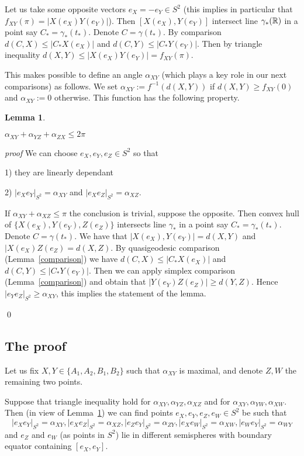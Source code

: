 \documentclass[a4paper,12pt]{article}
\newtheorem{lemma}[theorem]{Lemma}
\theoremstyle{definition}
\theoremstyle{definition}
\theoremstyle{definition}
\begin{document}
Let us take some opposite vectors $e_X=- e_Y\in S^2$ (this implies in particular
that $f_{XY}(\pi)=|X(e_X) Y(e_Y)|$).
Then $[X(e_X), Y(e_Y)]$ intersect line $\gamma_*({\mathbb R})$ in a point say
$C_*=\gamma_*(t_*)$.  Denote  $C=\gamma(t_*)$.
By comparison $d(C,X)\le |C_*X(e_X)|$ and $d(C,Y)\le |C_*Y(e_Y)|$.
Then by triangle inequality $d(X,Y)\le |X(e_X) Y(e_Y)|=f_{XY}(\pi)$.


This makes possible to define an angle $\alpha_{XY}$ (which plays a key role
in our next comparisons) as follows. We set
  $\alpha_{XY}:= f^{-1}(d(X,Y))$  if $d(X,Y)\ge f_{XY}(0)$
  and   $\alpha_{XY}:=0$
  otherwise. 
  This function has the following property.
  
  
  
   \begin{lemma}\label{<2pi}
  
 
   $\alpha_{XY}+\alpha_{YZ}+\alpha_{ZX}\le2\pi$
    
     \end{lemma}
     
     {\it proof}
     We can choose $e_X, e_Y, e_Z\in S^2$ so that
     
    1)  they are linearly dependant
    
    2) $|e_Xe_Y|_{S^2}=\alpha_{XY}$
     and $|e_Xe_Z|_{S^2}=\alpha_{XZ}$.
     
     If $\alpha_{XY}   + \alpha_{XZ}\le \pi$ the conclusion is trivial,
     suppose the opposite. Then convex hull
     of $\{X(e_X), Y(e_Y), Z(e_Z)\}$ intersects line $\gamma_*$
     in a point say
$C_*=\gamma_*(t_*)$.  Denote  $C=\gamma(t_*)$.
We have that
$|X(e_X), Y(e_Y)|=d(X,Y)$
and $|X(e_X)Z(e_Z)=d(X,Z)$.
By quasigeodesic comparison (Lemma~\ref{comparison}) we have $d(C,X)\le |C_*X(e_X)|$ and $d(C,Y)\le |C_*Y(e_Y)|$. Then we can apply
simplex comparison (Lemma~\ref{comparison}) and obtain
that 
$|Y(e_Y)Z(e_Z)|\ge d(Y,Z)$.
Hence $|e_Ye_Z|_{S^2}\ge \alpha_{XY}$,
this implies
 the statement
of the lemma.
          
    \qed\par\medskip
         
   
    \subsection{The proof }
    
       Let us fix $X,Y\in\{A_1, A_2, B_1, B_2\}$ such that $\alpha_{XY}$ is maximal,
    and denote $Z,W$ the remaining two points.
    
   
    Suppose that
    triangle inequality hold for $\alpha_{XY}, \alpha_{YZ}, \alpha_{XZ}$ and for
   $\alpha_{XY}, \alpha_{YW}, \alpha_{XW}$.    
   Then (in view of Lemma~\ref{<2pi}) we can find  points  $e_X, e_Y,e_Z,e_W\in S^2$ be such that
   $$|e_Xe_Y|_{S^2}=\alpha_{XY}, |e_Xe_Z|_{S^2}=\alpha_{XZ},   
   |e_Ze_Y|_{S^2}=\alpha_{ZY}, |e_Xe_W|_{S^2}=\alpha_{XW}, |e_We_Y|_{S^2}=\alpha_{WY}$$   
   and $e_Z$ and $e_W$ (as points in $S^2$) lie in different semispheres
   with boundary equator containing $[e_X,e_Y]$.
   
\end{document}
